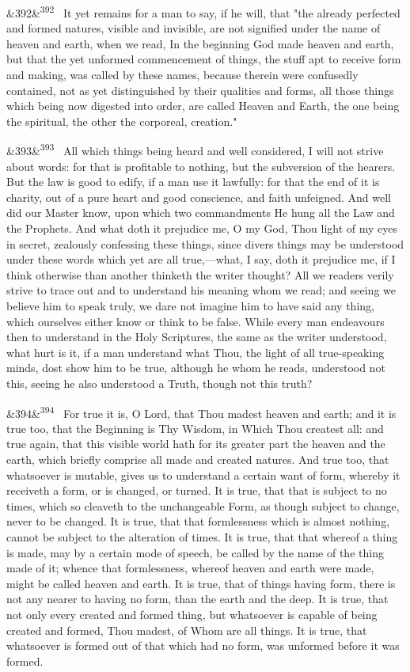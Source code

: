 \documentclass[12pt]{article}
\newcommand{\para}[1][]{\par\noindent\ifx&#1&\else\textsuperscript{\footnotesize #1}~\fi}
\begin{document}
\para[392] It yet remains for a man to say, if he will, that "the already perfected and formed natures, visible and invisible, are not signified under the name of heaven and earth, when we read, In the beginning God made heaven and earth, but that the yet unformed commencement of things, the stuff apt to receive form and making, was called by these names, because therein were confusedly contained, not as yet distinguished by their qualities and forms, all those things which being now digested into order, are called Heaven and Earth, the one being the spiritual, the other the corporeal, creation."

\para[393] All which things being heard and well considered, I will not strive about words: for that is profitable to nothing, but the subversion of the hearers. But the law is good to edify, if a man use it lawfully: for that the end of it is charity, out of a pure heart and good conscience, and faith unfeigned. And well did our Master know, upon which two commandments He hung all the Law and the Prophets. And what doth it prejudice me, O my God, Thou light of my eyes in secret, zealously confessing these things, since divers things may be understood under these words which yet are all true,---what, I say, doth it prejudice me, if I think otherwise than another thinketh the writer thought? All we readers verily strive to trace out and to understand his meaning whom we read; and seeing we believe him to speak truly, we dare not imagine him to have said any thing, which ourselves either know or think to be false. While every man endeavours then to understand in the Holy Scriptures, the same as the writer understood, what hurt is it, if a man understand what Thou, the light of all true-speaking minds, dost show him to be true, although he whom he reads, understood not this, seeing he also understood a Truth, though not this truth?

\para[394] For true it is, O Lord, that Thou madest heaven and earth; and it is true too, that the Beginning is Thy Wisdom, in Which Thou createst all: and true again, that this visible world hath for its greater part the heaven and the earth, which briefly comprise all made and created natures. And true too, that whatsoever is mutable, gives us to understand a certain want of form, whereby it receiveth a form, or is changed, or turned. It is true, that that is subject to no times, which so cleaveth to the unchangeable Form, as though subject to change, never to be changed. It is true, that that formlessness which is almost nothing, cannot be subject to the alteration of times. It is true, that that whereof a thing is made, may by a certain mode of speech, be called by the name of the thing made of it; whence that formlessness, whereof heaven and earth were made, might be called heaven and earth. It is true, that of things having form, there is not any nearer to having no form, than the earth and the deep. It is true, that not only every created and formed thing, but whatsoever is capable of being created and formed, Thou madest, of Whom are all things. It is true, that whatsoever is formed out of that which had no form, was unformed before it was formed.
\end{document}
